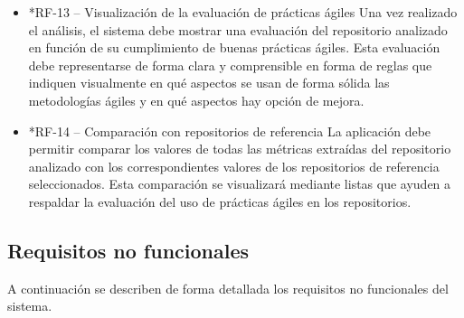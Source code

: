 \begin{itemize}
    \item*{RF-13 – Visualización de la evaluación de prácticas ágiles}
    Una vez realizado el análisis, el sistema debe mostrar una evaluación del repositorio analizado en función de su cumplimiento de buenas prácticas ágiles. Esta evaluación debe representarse de forma clara y comprensible en forma de reglas que indiquen visualmente en qué aspectos se usan de forma sólida las metodologías ágiles y en qué aspectos hay opción de mejora.
    
    \item*{RF-14 – Comparación con repositorios de referencia}
    La aplicación debe permitir comparar los valores de todas las métricas extraídas del repositorio analizado con los correspondientes valores de los repositorios de referencia seleccionados. Esta comparación se visualizará mediante listas que ayuden a respaldar la evaluación del uso de prácticas ágiles en los repositorios.
\end{itemize}

\subsection{Requisitos no funcionales}

A continuación se describen de forma detallada los requisitos no funcionales del sistema.

